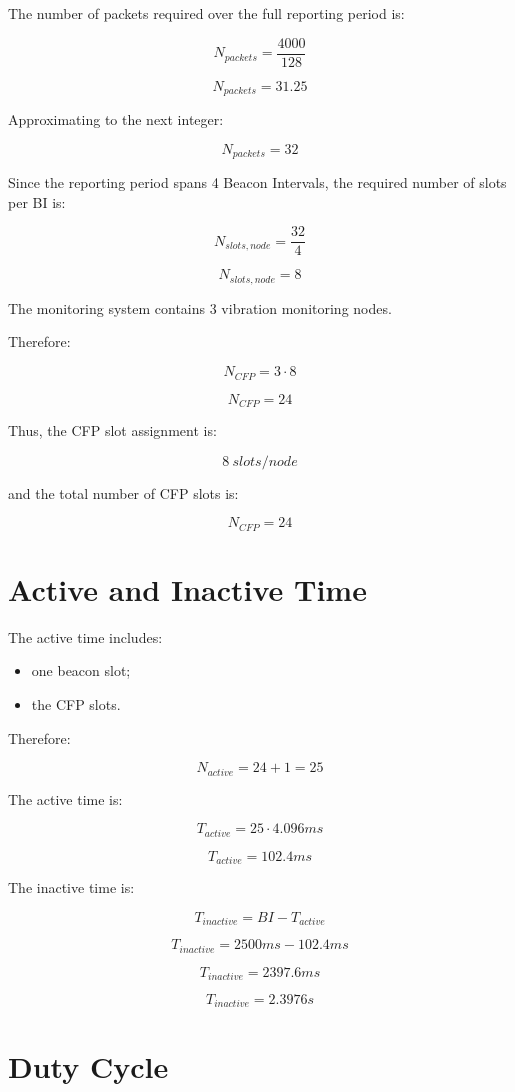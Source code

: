 \documentclass[a4paper,12pt]{article}
\begin{document}
The number of packets required over the full reporting period is:

\[
N_{packets}=\frac{4000}{128}
\]

\[
N_{packets}=31.25
\]

Approximating to the next integer:

\[
N_{packets}=32
\]

Since the reporting period spans 4 Beacon Intervals, the required number of slots per BI is:

\[
N_{slots,node}=\frac{32}{4}
\]

\[
N_{slots,node}=8
\]

The monitoring system contains 3 vibration monitoring nodes.

Therefore:

\[
N_{CFP}=3\cdot8
\]

\[
N_{CFP}=24
\]

Thus, the CFP slot assignment is:

\[
8\ slots/node
\]

and the total number of CFP slots is:

\[
N_{CFP}=24
\]

\section{Active and Inactive Time}

The active time includes:

\begin{itemize}
    \item one beacon slot;
    \item the CFP slots.
\end{itemize}

Therefore:

\[
N_{active}=24+1=25
\]

The active time is:

\[
T_{active}=25\cdot4.096ms
\]

\[
T_{active}=102.4ms
\]

The inactive time is:

\[
T_{inactive}=BI-T_{active}
\]

\[
T_{inactive}=2500ms-102.4ms
\]

\[
T_{inactive}=2397.6ms
\]

\[
T_{inactive}=2.3976s
\]

\section{Duty Cycle}
\end{document}
